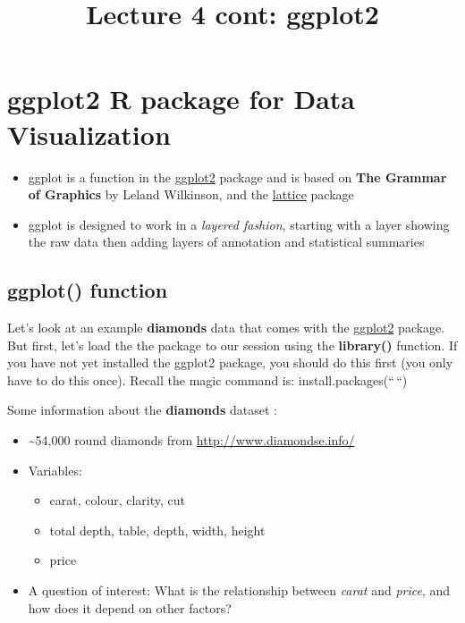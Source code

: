 \documentclass[
]{article}
\title{Lecture 4 cont: ggplot2}
\author{}
\date{\vspace{-2.5em}}
\providecommand{\tightlist}{%
  \setlength{\itemsep}{0pt}\setlength{\parskip}{0pt}}
\begin{document}
\maketitle

\hypertarget{ggplot2-r-package-for-data-visualization}{%
\section{ggplot2 R package for Data
Visualization}\label{ggplot2-r-package-for-data-visualization}}

\begin{itemize}
\tightlist
\item
  ggplot is a function in the
  \href{https://cran.r-project.org/web/packages/ggplot2/index.html}{ggplot2}
  package and is based on \textbf{The Grammar of Graphics} by Leland
  Wilkinson, and the
  \href{https://cran.r-project.org/web/packages/lattice/index.html}{lattice}
  package
\item
  ggplot is designed to work in a \emph{layered fashion}, starting with
  a layer showing the raw data then adding layers of annotation and
  statistical summaries
\end{itemize}

\hypertarget{ggplot-function}{%
\subsection{ggplot() function}\label{ggplot-function}}

Let's look at an example \textbf{diamonds} data that comes with the
\href{https://cran.r-project.org/web/packages/ggplot2/index.html}{ggplot2}
package. But first, let's load the the package to our session using the
\textbf{library()} function. If you have not yet installed the ggplot2
package, you should do this first (you only have to do this once).
Recall the magic command is: install.packages(``\,``)

Some information about the \textbf{diamonds} dataset :

\begin{itemize}
\tightlist
\item
  \textasciitilde54,000 round diamonds from
  \url{http://www.diamondse.info/}
\item
  Variables:

  \begin{itemize}
  \tightlist
  \item
    carat, colour, clarity, cut
  \item
    total depth, table, depth, width, height
  \item
    price
  \end{itemize}
\item
  A question of interest: What is the relationship between \emph{carat}
  and \emph{price}, and how does it depend on other factors?
\end{itemize}
\end{document}
